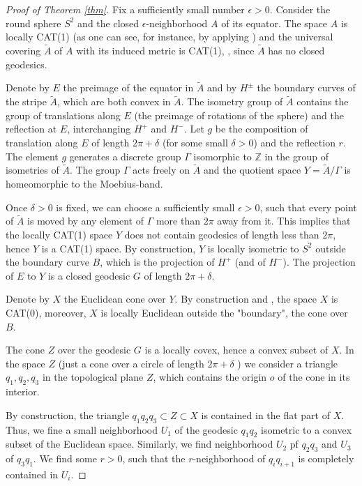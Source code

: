 \documentclass[12pt,leqno]{amsart}
\numberwithin{equation}{section}
\theoremstyle{remark}
\begin{document}
\begin{proof}[Proof of Theorem \ref{thm}]
Fix a sufficiently small number $\epsilon >0$.  Consider the round sphere $S^2$ and the closed 
$\epsilon$-neighborhood $A$  of its equator.   The space $A$ is locally CAT(1) (as one can see, for instance, by applying  \cite{LWcurv}) and the universal covering $\tilde A$ of $A$ with its induced metric is  CAT(1), \cite{Ballmann}, since $\tilde A$ has no closed geodesics.

Denote by $E$ the preimage of the equator in $\tilde A$  and by $H^{\pm}$ the boundary curves of the stripe $\tilde A$, which are both convex in $\tilde A$.    The isometry group of $\tilde A$ 
contains the group of translations  along $E$ (the preimage of rotations of the sphere) and 
the reflection at $E$, interchanging $H^+$ and $H^-$.  Let $g$   be the composition of translation along $E$  of length $2\pi +\delta$ (for some small $\delta >0$) and the reflection $r$.  The element $g$ generates a discrete group $\Gamma$ isomorphic to $\mathbb Z$ in the group of isometries  of $\tilde A$. The group $\Gamma$ acts freely on $\tilde A$ and the quotient space $Y =\tilde A/\Gamma$ is homeomorphic to the Moebius-band.

Once $\delta>0$ is fixed, we can choose a sufficiently small $\epsilon >0$, such that every point of $\tilde A$ is moved by any element of $\Gamma$ more than $2\pi$ away from it.  This implies that the locally CAT(1) space $Y$ does not  contain geodesics of length less than $2\pi$, hence $Y$ is a CAT(1) space.  By construction, $Y$ is locally isometric to $S^2$ outside the boundary curve $B$, which is the projection of $H^+$  (and of $H^-$).  The projection of $E$ to $Y$ is a closed geodesic $G$ of length $2\pi +\delta$.



Denote by $X$ the Euclidean cone over $Y$.   By construction and \cite{BBI}, the space $X$ is CAT(0), moreover, $X$ is locally Euclidean outside the "boundary", the cone over $B$.

  The cone $Z$  over the  geodesic $G$ is a locally covex, hence a convex subset of $X$.
In the space $Z$  (just a cone over a circle of length $2\pi +\delta$ )   we consider a triangle
$q_1,q_2,q_3$ 
in the topological plane $Z$, which contains the origin $o$ of the cone in its interior.


By construction, the triangle $q_1q_2q_3 \subset Z\subset X$ is contained in the flat part of $X$.
Thus, we fine a small neighborhood $U_1$ of the geodesic $q_1q_2$ isometric to a convex subset of the Euclidean space.  Similarly, we find neighborhood $U_2$ pf $q_2q_3$ and $U_3$ of $q_3q_1$.
We find some $r>0$, such that the $r$-neighborhood of $q_iq_{i+1}$ is completely contained in $U_i$. 


\end{proof}
\end{document}
